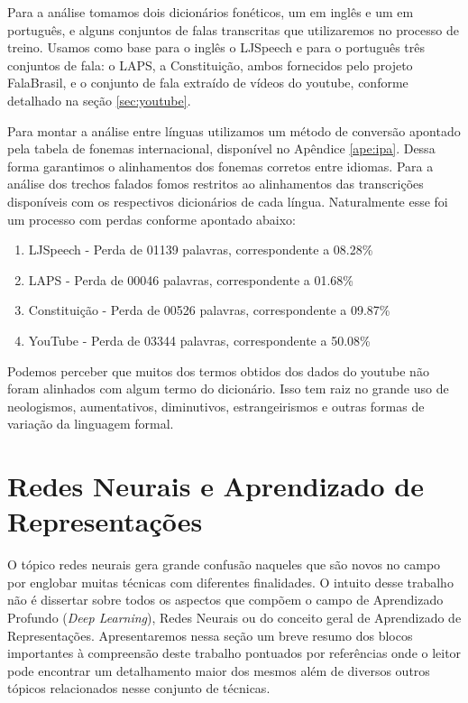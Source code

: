 Para a análise tomamos dois dicionários fonéticos, um em inglês e um em português, e alguns conjuntos de falas transcritas que utilizaremos no processo de treino. Usamos como base para o inglês o LJSpeech e para o português três conjuntos de fala: o LAPS, a Constituição, ambos fornecidos pelo projeto FalaBrasil, e o conjunto de fala extraído de vídeos do youtube, conforme detalhado na seção \ref{sec:youtube}.

Para montar a análise entre línguas utilizamos um método de conversão apontado pela tabela de fonemas internacional, disponível no Apêndice \ref{ape:ipa}. Dessa forma garantimos o alinhamentos dos fonemas corretos entre idiomas. Para a análise dos trechos falados fomos restritos ao alinhamentos das transcrições disponíveis com os respectivos dicionários de cada língua. Naturalmente esse foi um processo com perdas conforme apontado abaixo:
\begin{enumerate}
    \item LJSpeech - Perda de 01139 palavras, correspondente a 08.28\%
    \item LAPS - Perda de 00046 palavras, correspondente a 01.68\%
    \item Constituição - Perda de 00526 palavras, correspondente a 09.87\%
    \item YouTube - Perda de 03344 palavras, correspondente a 50.08\%
\end{enumerate}

Podemos perceber que muitos dos termos obtidos dos dados do youtube não foram alinhados com algum termo do dicionário. Isso tem raiz no grande uso de neologismos, aumentativos, diminutivos, estrangeirismos e outras formas de variação da linguagem formal.

\section{Redes Neurais e Aprendizado de Representações}
\label{sec:redes}
O tópico redes neurais gera grande confusão naqueles que são novos no campo por englobar muitas técnicas com diferentes finalidades. O intuito desse trabalho não é dissertar sobre todos os aspectos que compõem o campo de Aprendizado Profundo (\textit{Deep Learning}), Redes Neurais ou do conceito geral de Aprendizado de Representações. Apresentaremos nessa seção um breve resumo dos blocos importantes à compreensão deste trabalho pontuados por referências onde o leitor pode encontrar um detalhamento maior dos mesmos além de diversos outros tópicos relacionados nesse conjunto de técnicas.

